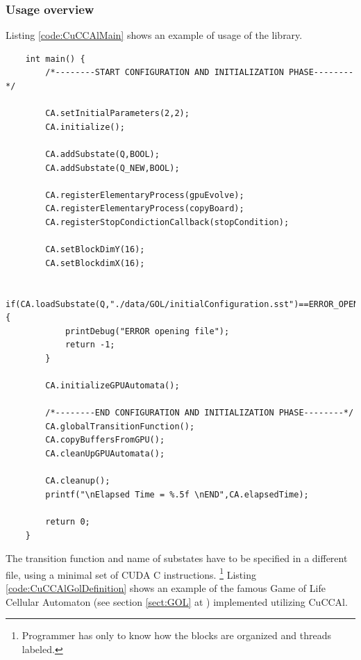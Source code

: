 \subsubsection{Usage overview}
 Listing \ref{code:CuCCAlMain} shows an example of usage of the library.
 
 
\begin{lstlisting}
	int main() {
		/*--------START CONFIGURATION AND INITIALIZATION PHASE--------*/
	
		CA.setInitialParameters(2,2);
		CA.initialize();
	
		CA.addSubstate(Q,BOOL);
		CA.addSubstate(Q_NEW,BOOL);
		
		CA.registerElementaryProcess(gpuEvolve);
		CA.registerElementaryProcess(copyBoard);
		CA.registerStopCondictionCallback(stopCondition);
	
		CA.setBlockDimY(16);
		CA.setBlockdimX(16);
	
		if(CA.loadSubstate(Q,"./data/GOL/initialConfiguration.sst")==ERROR_OPENING_FILE){
			printDebug("ERROR opening file");
			return -1;
		}
	
		CA.initializeGPUAutomata();
	
		/*--------END CONFIGURATION AND INITIALIZATION PHASE--------*/
		CA.globalTransitionFunction();
		CA.copyBuffersFromGPU();
		CA.cleanUpGPUAutomata();
	
		CA.cleanup();
		printf("\nElapsed Time = %.5f \nEND",CA.elapsedTime);
		
		return 0;
	}	
\end{lstlisting} 

The transition function and name of substates have to be specified in a different
file, using a minimal set of CUDA C instructions. \footnote{Programmer has
only to know how the blocks are organized and threads labeled.}
Listing \ref{code:CuCCAlGolDefinition} shows an example of the famous Game of Life Cellular Automaton (see
section \ref{sect:GOL} at \pageref{sect:GOL}) implemented utilizing CuCCAl.


